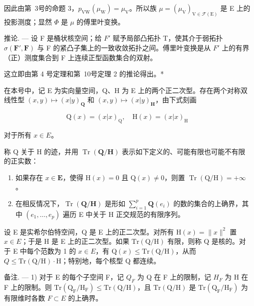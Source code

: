 因此由第~3号的命题 3，\(p_{\mathrm{VW}}(\mu_{\mathrm{W}}) = \mu_{\mathrm{V}}\)。所以族 \(\mu = (\mu_{\mathrm{V}})_{\mathrm{V} \in \mathcal{F}(\mathrm{E})}\) 是 E 上的投影测度；显然 \(\Phi\) 是 \(\mu\) 的傅里叶变换。

推论. --- 设 F 是桶状核空间；给 \(F'\) 赋予局部凸拓扑 T，使其介于弱拓扑 \(\sigma(\mathbf{F}',\mathbf{F})\) 与 F 的紧凸子集上的一致收敛拓扑之间。傅里叶变换是从 \(F'\) 上的有界（正）测度集合到 F 上连续正型函数集合的双射。

这立即由第 4 号定理和第~10号定理 2 的推论得出。*



在本号中，记 E 为实向量空间，Q、H 为 E 上的两个正二次型。存在两个对称双线性型 \((x,y)\mapsto(x|y)_{\mathbf{Q}}\) 和 \((x,y)\mapsto(x|y)_{\mathbf{H}}\)，由下式刻画

\[
\mathrm{Q} (x) = (x | x) _ {\mathrm{Q}}, \quad \mathrm{H} (x) = (x | x) _ {\mathrm{H}}
\]

对于所有 \(x \in E\)。

称 Q 关于 H 的迹，并用 \(\operatorname{Tr}\left(\mathbf{Q}/\mathbf{H}\right)\) 表示如下定义的、可能有限也可能不有限的正实数：

\begin{enumerate}
\def\labelenumi{\alph{enumi})}
\item
  如果存在 \(x \in \mathbf{E}\)，使得 \(\mathrm{H}(x) = 0\) 且 \(\mathrm{Q}(x) \neq 0\)，则置 \(\operatorname{Tr}(\mathrm{Q} / \mathrm{H}) = +\infty\)。
\item
  在相反情况下，\(\operatorname{Tr}(\mathbf{Q}/\mathbf{H})\) 是形如 \(\sum_{i=1}^{p} \mathbf{Q}(e_i)\) 的数的集合的上确界，其中 \((e_1, \ldots, e_p)\) 遍历 E 中关于 H 正交规范的有限序列。
\end{enumerate}

设 E 是实希尔伯特空间，Q 是 E 上的正二次型。对所有 \(\mathrm{H}(x)=\|x\|^{2}\) 置 \(x\in E\)；于是 H 是 E 上的正二次型。如果 \(\mathrm{Tr}\left(\mathrm{Q}/\mathrm{H}\right)\) 有限，则称 Q 是核的。对于 E 中每个范数为 1 的 \(x\in E\)，有 \(\mathrm{Q}(x)\leqslant\mathrm{Tr}\left(\mathrm{Q}/\mathrm{H}\right)\)，从而 \(Q\leqslant\mathrm{Tr}\left(\mathrm{Q}/\mathrm{H}\right)\cdot\mathrm{H}\)；特别地，每个核型 Q 都连续。

备注. --- 1) 对于 E 的每个子空间 F，记 \(Q_{F}\) 为 Q 在 F 上的限制，记 \(H_{F}\) 为 H 在 F 上的限制。则 \(\mathrm{Tr}\left(\mathrm{Q}_{\mathrm{F}}/\mathrm{H}_{\mathrm{F}}\right) \leqslant \mathrm{Tr}\left(\mathrm{Q}/\mathrm{H}\right)\)，且 \(\mathrm{Tr}\left(\mathrm{Q}/\mathrm{H}\right)\) 是 \(\mathrm{Tr}\left(\mathrm{Q}_{\mathrm{F}}/\mathrm{H}_{\mathrm{F}}\right)\) 为有限维时各数 \(F \subset E\) 的上确界。

